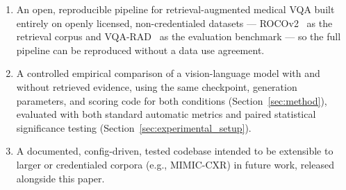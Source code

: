 \begin{enumerate}
  \item An open, reproducible pipeline for retrieval-augmented medical VQA
        built entirely on openly licensed, non-credentialed datasets ---
        ROCOv2~\cite{ruckert2024rocov2} as the retrieval corpus and
        VQA-RAD~\cite{lau2018vqarad} as the evaluation benchmark --- so
        the full pipeline can be reproduced without a data use agreement.
  \item A controlled empirical comparison of a vision-language model with
        and without retrieved evidence, using the same checkpoint,
        generation parameters, and scoring code for both conditions
        (Section~\ref{sec:method}), evaluated with both standard automatic
        metrics and paired statistical significance testing
        (Section~\ref{sec:experimental_setup}).
  \item A documented, config-driven, tested codebase intended to be
        extensible to larger or credentialed corpora (e.g., MIMIC-CXR) in
        future work, released alongside this paper.
\end{enumerate}

